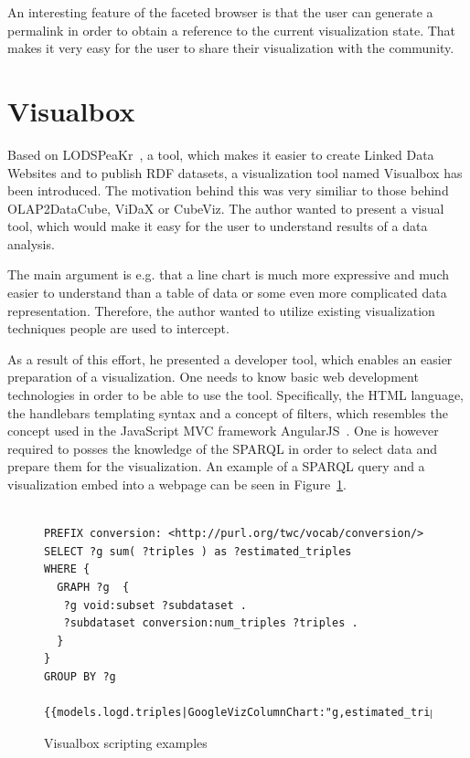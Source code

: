 An interesting feature of the faceted browser is that the user can 
generate a permalink in order to obtain a reference to the current visualization 
state. That makes it very easy for the user to share their visualization with the 
community.

\section{Visualbox}
Based on LODSPeaKr~\cite{lodspeakr}, a tool, which makes it easier to create Linked Data Websites 
and to publish RDF datasets, a visualization tool named Visualbox has been 
introduced. The motivation behind this was very similiar to those behind 
OLAP2DataCube, ViDaX or CubeViz. The author wanted to present a visual tool,
which would 
make it easy for the user to understand results of a data analysis.

The main argument is e.g. that a line chart is much more expressive and much easier
to understand than a table of data or some even more complicated data 
representation. Therefore, the author wanted to utilize existing visualization 
techniques people are used to intercept.

As a result of this effort, he presented a developer tool, which enables an easier preparation
of a visualization. One needs to know basic web development technologies 
in order to be able to use the tool. Specifically, the HTML language, the 
handlebars templating syntax and a concept of filters, which resembles the 
concept used in the JavaScript MVC framework AngularJS~\cite{angularjs}. One is however required
to posses the knowledge of the SPARQL in order to select data and prepare them for the 
visualization. An example of a SPARQL query and a visualization embed into a webpage can be seen
in Figure~\ref{visualbox-example}.

\begin{figure}
\scriptsize\begin{verbatim}

PREFIX conversion: <http://purl.org/twc/vocab/conversion/>
SELECT ?g sum( ?triples ) as ?estimated_triples
WHERE {
  GRAPH ?g  {
   ?g void:subset ?subdataset .
   ?subdataset conversion:num_triples ?triples .
  }
} 
GROUP BY ?g

{{models.logd.triples|GoogleVizColumnChart:"g,estimated_triples,width=1200"}}
\end{verbatim}\normalsize
\caption{Visualbox scripting examples}
\label{visualbox-example}
\end{figure}

